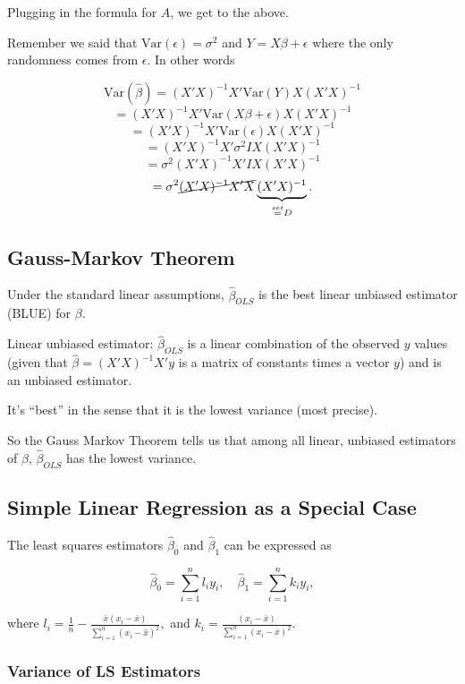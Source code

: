 \documentclass[
  letterpaper,
  DIV=11,
  numbers=noendperiod]{scrreport}
\begin{document}
Plugging in the formula for \(A\), we get to the above.

Remember we said that \(\text{Var}(\epsilon) = \sigma^2\) and
\(Y = X\beta + \epsilon\) where the only randomness comes from
\(\epsilon\). In other words

\[\text{Var}(\hat \beta) = (X'X)^{-1} X' \text{Var}(Y) X (X'X)^{-1}\]
\[ = (X'X)^{-1} X' \text{Var}(X\beta + \epsilon) X (X'X)^{-1}\]
\[ = (X'X)^{-1} X' \text{Var}(\epsilon) X (X'X)^{-1}\]
\[ = (X'X)^{-1} X' \sigma^2 I X (X'X)^{-1}\]
\[ = \sigma^2 (X'X)^{-1} X' I X (X'X)^{-1}\]
\[ = \sigma^2 \cancel{(X'X)^{-1} X' X }\underbrace{(X'X)^{-1}}_{\stackrel{set}{=}D}.\]

\hypertarget{gauss-markov-theorem}{%
\subsection{Gauss-Markov Theorem}\label{gauss-markov-theorem}}

Under the standard linear assumptions, \(\hat \beta_{OLS}\) is the best
linear unbiased estimator (BLUE) for \(\beta\).

Linear unbiased estimator: \(\hat \beta_{OLS}\) is a linear combination
of the observed \(y\) values (given that \(\hat \beta = (X'X)^{-1}X'y\)
is a matrix of constants times a vector \(y\)) and is an unbiased
estimator.

It's ``best'' in the sense that it is the lowest variance (most
precise).

So the Gauss Markov Theorem tells us that among all linear, unbiased
estimators of \(\beta\), \(\hat \beta_{OLS}\) has the lowest variance.

\hypertarget{simple-linear-regression-as-a-special-case}{%
\subsection{Simple Linear Regression as a Special
Case}\label{simple-linear-regression-as-a-special-case}}

The least squares estimators \(\hat \beta_0\) and \(\hat \beta_1\) can
be expressed as

\[\hat \beta_0 = \sum_{i=1}^n l_i y_i, \quad \hat \beta_1 = \sum_{i=1}^n k_i y_i,\]

where
\(l_i = \frac{1}{n} - \frac{\bar x(x_i - \bar x)}{\sum_{i=1}^n (x_i - \hat x)^2},\)
and \(k_i = \frac{(x_i - \bar x)}{\sum_{i=1}^n (x_i - \bar x)^2}\).

\hypertarget{variance-of-ls-estimators}{%
\subsubsection{Variance of LS
Estimators}\label{variance-of-ls-estimators}}
\end{document}
